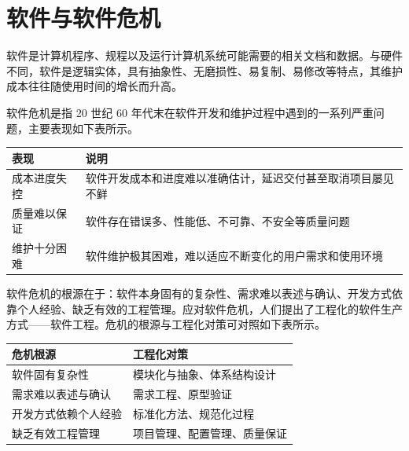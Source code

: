 \documentclass[
]{ctexbook}
\newcounter{none}
\begin{document}
\section{软件与软件危机}\label{ux8f6fux4ef6ux4e0eux8f6fux4ef6ux5371ux673a}

软件是计算机程序、规程以及运行计算机系统可能需要的相关文档和数据。与硬件不同，软件是逻辑实体，具有抽象性、无磨损性、易复制、易修改等特点，其维护成本往往随使用时间的增长而升高。

软件危机是指 20 世纪 60
年代末在软件开发和维护过程中遇到的一系列严重问题，主要表现如下表所示。

{\def\LTcaptype{none} %
\begin{longtable}[]{@{}
  >{\raggedright\arraybackslash}p{}
  >{\raggedright\arraybackslash}p{}@{}}
\toprule\noalign{}
\begin{minipage}[b]{\linewidth}\raggedright
表现
\end{minipage} & \begin{minipage}[b]{\linewidth}\raggedright
说明
\end{minipage} \\
\midrule\noalign{}
\endhead
\bottomrule\noalign{}
\endlastfoot
成本进度失控 &
软件开发成本和进度难以准确估计，延迟交付甚至取消项目屡见不鲜 \\
质量难以保证 & 软件存在错误多、性能低、不可靠、不安全等质量问题 \\
维护十分困难 & 软件维护极其困难，难以适应不断变化的用户需求和使用环境 \\
\end{longtable}
}

软件危机的根源在于：软件本身固有的复杂性、需求难以表述与确认、开发方式依靠个人经验、缺乏有效的工程管理。应对软件危机，人们提出了工程化的软件生产方式------软件工程。危机的根源与工程化对策可对照如下表所示。

{\def\LTcaptype{none} %
\begin{longtable}[]{@{}ll@{}}
\toprule\noalign{}
危机根源 & 工程化对策 \\
\midrule\noalign{}
\endhead
\bottomrule\noalign{}
\endlastfoot
软件固有复杂性 & 模块化与抽象、体系结构设计 \\
需求难以表述与确认 & 需求工程、原型验证 \\
开发方式依赖个人经验 & 标准化方法、规范化过程 \\
缺乏有效工程管理 & 项目管理、配置管理、质量保证 \\
\end{longtable}
}
\end{document}
